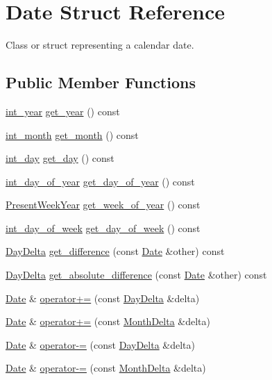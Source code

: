 \hypertarget{structDate}{\section{\-Date \-Struct \-Reference}
\label{structDate}
}


\-Class or struct representing a calendar date.  


\subsection*{\-Public \-Member \-Functions}
\begin{DoxyCompactItemize}
\item 
\hyperlink{types_8h_a7ff53e164374f5b24e06f3c04362e61d}{int\-\_\-year} \hyperlink{structDate_a970cb8375d137e19cea4c042a0b8d64a}{get\-\_\-year} () const 
\item 
\hyperlink{types_8h_a6e77e4e37237551e3c2f808f02764cec}{int\-\_\-month} \hyperlink{structDate_afa1025e5868c30b20b1ff1481e30f08d}{get\-\_\-month} () const 
\item 
\hyperlink{types_8h_a2ee09cac57b5b71a2cf76051e877f320}{int\-\_\-day} \hyperlink{structDate_a044d6531a4335e3136f7aedd67fc0db0}{get\-\_\-day} () const 
\item 
\hyperlink{types_8h_ae73cc4736210d3120e1073d94bbac092}{int\-\_\-day\-\_\-of\-\_\-year} \hyperlink{structDate_af19ad4f968f7799a336d2112c784bc9b}{get\-\_\-day\-\_\-of\-\_\-year} () const 
\item 
\hyperlink{structPresentWeekYear}{\-Present\-Week\-Year} \hyperlink{structDate_a138ce231feac1890d4e69d253e0e8e8c}{get\-\_\-week\-\_\-of\-\_\-year} () const 
\item 
\hyperlink{types_8h_a78b244794c680f1753a6d92eed77aeda}{int\-\_\-day\-\_\-of\-\_\-week} \hyperlink{structDate_ad5ff9ecae53c65ba2b45dc4f69f37d5c}{get\-\_\-day\-\_\-of\-\_\-week} () const 
\item 
\hyperlink{structDayDelta}{\-Day\-Delta} \hyperlink{structDate_ae175df5ffb7f12378d41453209994e59}{get\-\_\-difference} (const \hyperlink{structDate}{\-Date} \&other) const 
\item 
\hyperlink{structDayDelta}{\-Day\-Delta} \hyperlink{structDate_a293adccbbf2f42bd54dde9fb0de81f92}{get\-\_\-absolute\-\_\-difference} (const \hyperlink{structDate}{\-Date} \&other) const 
\item 
\hyperlink{structDate}{\-Date} \& \hyperlink{structDate_a0d7e72cd689c957e981f64da5565c5cc}{operator+=} (const \hyperlink{structDayDelta}{\-Day\-Delta} \&delta)
\item 
\hyperlink{structDate}{\-Date} \& \hyperlink{structDate_a6a69c92d288794dc5f33647b7fb67d67}{operator+=} (const \hyperlink{structMonthDelta}{\-Month\-Delta} \&delta)
\item 
\hyperlink{structDate}{\-Date} \& \hyperlink{structDate_a4fd0dac9dc8aeb5dbd008717c6bc8974}{operator-\/=} (const \hyperlink{structDayDelta}{\-Day\-Delta} \&delta)
\item 
\hyperlink{structDate}{\-Date} \& \hyperlink{structDate_afe99434d7c9419d5505e9ba8ff599d05}{operator-\/=} (const \hyperlink{structMonthDelta}{\-Month\-Delta} \&delta)
\end{DoxyCompactItemize}
